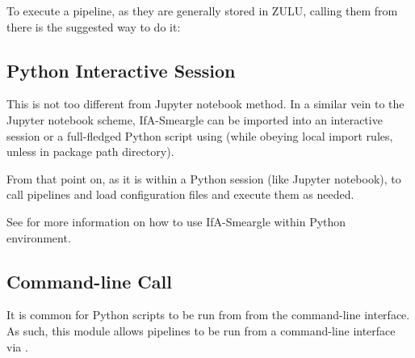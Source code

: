 \documentclass[letterpaper,10pt,english]{sphinxmanual}
\begin{document}
\begin{sphinxVerbatim}[commandchars=\\\{\}]
  
\end{sphinxVerbatim}

To execute a pipeline, as they are generally stored in ZULU, calling them
from there is the suggested way to do it:

\begin{sphinxVerbatim}[commandchars=\\\{\}]
   
\end{sphinxVerbatim}


\subsection{Python Interactive Session}
\label{\detokenize{quickstart:python-interactive-session}}
This is not too different from Jupyter notebook method. In a similar vein to
the Jupyter notebook scheme, IfA-Smeargle can be imported into an interactive
session or a full-fledged Python script using 
(while obeying local import rules, unless in package path directory).

From that point on, as it is within a Python session (like Jupyter notebook),
to call pipelines and load configuration files and execute them as needed.

See {\hyperref[\detokenize{quickstart:jupyter-notebook}]{}} for more information on how to use IfA-Smeargle within
Python environment.


\subsection{Command-line Call}
\label{\detokenize{quickstart:command-line-call}}
It is common for Python scripts to be run from from the command-line interface.
As such, this module allows pipelines to be run from a command-line interface
via .
\end{document}
